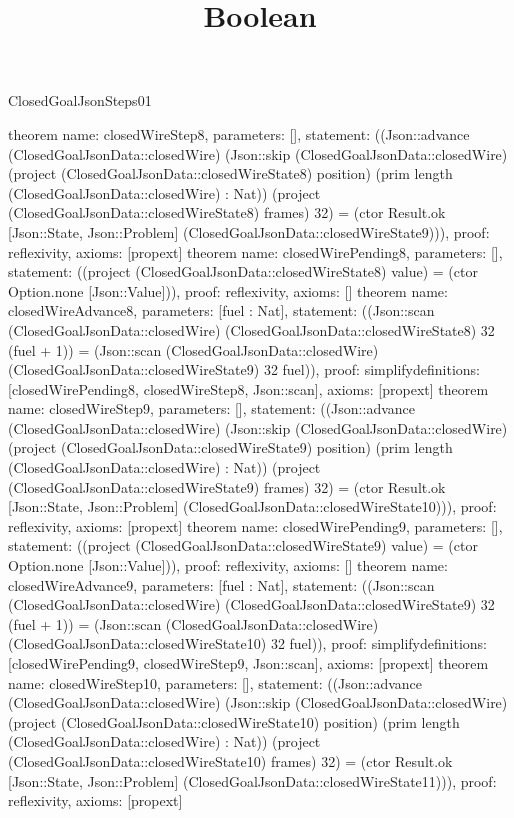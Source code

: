 \begin{lexlean}{ClosedGoalJsonSteps01}
\title{Boolean}
\begin{semanticmodule}
theorem{
 name: closedWireStep8, parameters: [],
 statement: ((Json::advance (ClosedGoalJsonData::closedWire) (Json::skip (ClosedGoalJsonData::closedWire) (project (ClosedGoalJsonData::closedWireState8) position) (prim length (ClosedGoalJsonData::closedWire) : Nat)) (project (ClosedGoalJsonData::closedWireState8) frames) 32) = (ctor Result.ok [Json::State, Json::Problem] (ClosedGoalJsonData::closedWireState9))), proof: reflexivity{}, axioms: [propext]
}
theorem{
 name: closedWirePending8, parameters: [],
 statement: ((project (ClosedGoalJsonData::closedWireState8) value) = (ctor Option.none [Json::Value])), proof: reflexivity{}, axioms: []
}
theorem{
 name: closedWireAdvance8, parameters: [fuel : Nat],
 statement: ((Json::scan (ClosedGoalJsonData::closedWire) (ClosedGoalJsonData::closedWireState8) 32 (fuel + 1)) = (Json::scan (ClosedGoalJsonData::closedWire) (ClosedGoalJsonData::closedWireState9) 32 fuel)), proof: simplify{definitions: [closedWirePending8, closedWireStep8, Json::scan]}, axioms: [propext]
}
theorem{
 name: closedWireStep9, parameters: [],
 statement: ((Json::advance (ClosedGoalJsonData::closedWire) (Json::skip (ClosedGoalJsonData::closedWire) (project (ClosedGoalJsonData::closedWireState9) position) (prim length (ClosedGoalJsonData::closedWire) : Nat)) (project (ClosedGoalJsonData::closedWireState9) frames) 32) = (ctor Result.ok [Json::State, Json::Problem] (ClosedGoalJsonData::closedWireState10))), proof: reflexivity{}, axioms: [propext]
}
theorem{
 name: closedWirePending9, parameters: [],
 statement: ((project (ClosedGoalJsonData::closedWireState9) value) = (ctor Option.none [Json::Value])), proof: reflexivity{}, axioms: []
}
theorem{
 name: closedWireAdvance9, parameters: [fuel : Nat],
 statement: ((Json::scan (ClosedGoalJsonData::closedWire) (ClosedGoalJsonData::closedWireState9) 32 (fuel + 1)) = (Json::scan (ClosedGoalJsonData::closedWire) (ClosedGoalJsonData::closedWireState10) 32 fuel)), proof: simplify{definitions: [closedWirePending9, closedWireStep9, Json::scan]}, axioms: [propext]
}
theorem{
 name: closedWireStep10, parameters: [],
 statement: ((Json::advance (ClosedGoalJsonData::closedWire) (Json::skip (ClosedGoalJsonData::closedWire) (project (ClosedGoalJsonData::closedWireState10) position) (prim length (ClosedGoalJsonData::closedWire) : Nat)) (project (ClosedGoalJsonData::closedWireState10) frames) 32) = (ctor Result.ok [Json::State, Json::Problem] (ClosedGoalJsonData::closedWireState11))), proof: reflexivity{}, axioms: [propext]
}
\end{semanticmodule}
\end{lexlean}
